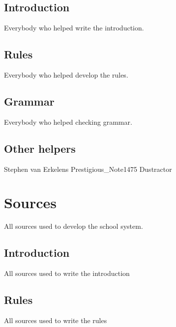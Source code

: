 \documentclass[titlepage]{article}
\begin{document}
\subsection{Introduction}
Everybody who helped write the introduction.
\subsection{Rules}
Everybody who helped develop the rules.
\subsection{Grammar}
Everybody who helped checking grammar.
\subsection{Other helpers}
Stephen van Erkelens
\newline
Prestigious\_Note1475
\newline
Dustractor

\newpage
\section{Sources}
All sources used to develop the school system.
\subsection{Introduction}
All sources used to write the introduction
\subsection{Rules}
All sources used to write the rules
\end{document}
